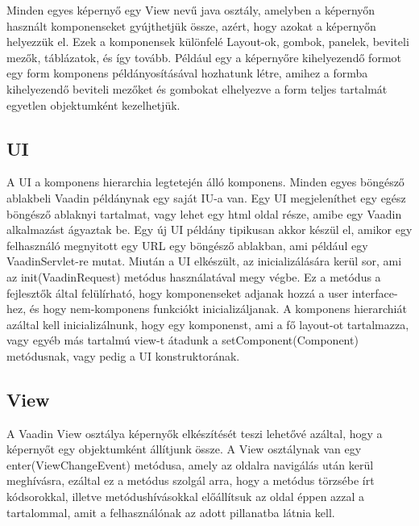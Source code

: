 \documentclass[centeredchapter]{thesis-ekf}
\theoremstyle{definition}
\theoremstyle{remark}
\begin{document}
Minden egyes képernyő egy View nevű java osztály, amelyben a képernyőn használt komponenseket gyújthetjük össze, azért, hogy azokat a képernyőn helyezzük el. Ezek a komponensek különfelé Layout-ok, gombok, panelek, beviteli mezők, táblázatok, és így tovább. Például egy a képernyőre kihelyezendő formot egy form komponens példányosításával hozhatunk létre, amihez a formba kihelyezendő beviteli mezőket és gombokat elhelyezve a form teljes tartalmát egyetlen objektumként kezelhetjük.

\subsection{UI}

A UI a komponens hierarchia legtetején álló komponens. Minden egyes böngésző ablakbeli 
Vaadin példánynak egy saját IU-a van. Egy UI megjeleníthet egy egész böngésző ablaknyi tartalmat, vagy lehet egy html oldal része, amibe egy Vaadin alkalmazást ágyaztak be.
Egy új UI példány tipikusan akkor készül el, amikor egy felhasználó megnyitott egy URL egy böngésző ablakban, ami például egy VaadinServlet-re mutat.
Miután a UI elkészült, az inicializálására kerül sor, ami az init(VaadinRequest) metódus használatával megy végbe. Ez a metódus a fejlesztők által felülírható, hogy komponenseket adjanak hozzá a user interface-hez, és hogy nem-komponens funkciókt inicializáljanak.
A komponens hierarchiát azáltal kell inicializálnunk, hogy egy komponenst, ami a fő layout-ot tartalmazza, vagy egyéb más tartalmú view-t átadunk a setComponent(Component) metódusnak, vagy pedig a UI konstruktorának.

\subsection{View}

A Vaadin View osztálya képernyők elkészítését teszi lehetővé azáltal, hogy a képernyőt egy objektumként állítjunk össze. A View osztálynak van egy enter(ViewChangeEvent) metódusa, amely az oldalra navigálás után kerül meghívásra, ezáltal ez a metódus szolgál arra, hogy a metódus törzsébe írt kódsorokkal, illetve metódushívásokkal előállítsuk az oldal éppen azzal a tartalommal, amit a felhasználónak az adott pillanatba látnia kell.
\end{document}
